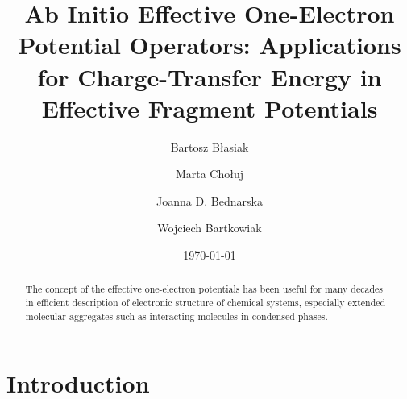 


\title{Ab Initio Effective One-Electron Potential Operators:
Applications for Charge-Transfer Energy in Effective Fragment Potentials}

\author{Bartosz B{\l}asiak}

\author{Marta Cho{\l}uj} 
\author{Joanna D. Bednarska}
\author{Wojciech Bartkowiak}


\date{\today}

\begin{abstract}
The concept of the effective one-electron potentials has been useful for many decades
in efficient description of electronic structure of chemical systems, especially extended
molecular aggregates such as interacting molecules in condensed phases.
\end{abstract}

\pacs{}

\maketitle

\tableofcontents

\section{\label{ss.5.2}Introduction}

